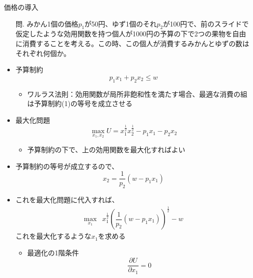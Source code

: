 \documentclass[dvipdfmx,11pt]{beamer}
\begin{document}
\begin{frame}{価格の導入}
  \begin{itemize}
    \item[問.] みかん1個の価格$p_1$が50円、ゆず1個のそれ$p_2$が100円で、前のスライドで仮定したような効用関数を持つ個人が1000円の予算の下で2つの果物を自由に消費することを考える。この時、この個人が消費するみかんとゆずの数はそれぞれ何個か。
    \item 予算制約
    \[p_1 x_1 + p_2 x_2 \leq w \tag{1}\]
    \begin{itemize}
      \item ワルラス法則：効用関数が局所非飽和性を満たす場合、最適な消費の組は予算制約(1)の等号を成立させる
    \end{itemize}
    \item 最大化問題
    \[\max_{x_1, x_2} U = x_1^{\frac{1}{2}}x_2^{\frac{1}{2}} - p_1 x_1 - p_2 x_2 \tag{2} \]
    \begin{itemize}
      \item 予算制約の下で、上の効用関数を最大化すればよい
    \end{itemize}
  \end{itemize}
\end{frame}

\begin{frame}{}
  \begin{itemize}
    \item 予算制約の等号が成立するので、
    \[x_2 = \dfrac{1}{p_2} (w - p_1 x_1)\]
    \item これを最大化問題に代入すれば、
    \begin{align*}
      \max_{x_1} & x_1^{\frac{1}{2}} \left(\dfrac{1}{p_2} (w - p_1 x_1) \right)^{\frac{1}{2}} - w
    \end{align*}
    これを最大化するような$x_1$を求める
    \begin{itemize}
      \item 最適化の1階条件 
      \[\dfrac{\partial U}{\partial x_1} = 0\]
    \end{itemize}
  \end{itemize}
\end{frame}
\end{document}
